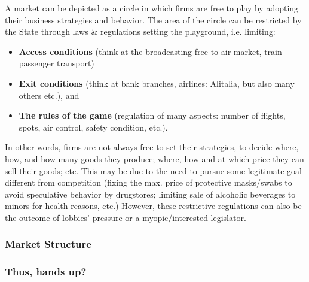         A market can be depicted as a circle in which firms are free to play by adopting their business strategies and behavior. The area of the circle can be restricted by the State through laws \& regulations setting the playground, i.e. limiting:
            \begin{itemize}
                \item \textbf{Access conditions} (think at the broadcasting free to air market, train passenger transport)
                \item \textbf{Exit conditions} (think at bank branches, airlines: Alitalia, but also many others etc.), and
                \item \textbf{The rules of the game} (regulation of many aspects: number of flights, spots, air control, safety condition, etc.).
            \end{itemize}
        In other words, firms are not always free to set their strategies, to decide where, how, and how many goods they produce; where, how and at which price they can sell their goods; etc. This may be due to the need to pursue some legitimate goal different from competition (fixing the max. price of protective masks/swabs to avoid speculative behavior by drugstores; limiting sale of alcoholic beverages to minors for health reasons, etc.) However, these restrictive regulations can also be the outcome of lobbies’ pressure or a myopic/interested legislator.

        \subsubsection{Market Structure}


        \subsubsection{Thus, hands up?}

